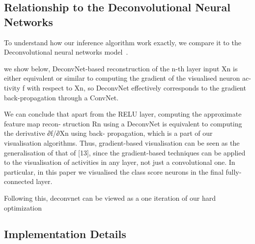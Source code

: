 \subsection{Relationship to the Deconvolutional Neural Networks}


To understand how our inference algorithm work exactly, we compare it to the Deconvolutional neural networks model~\cite{}.

we show below, DeconvNet-based reconstruction of the n-th layer input Xn is either equivalent or similar to computing the gradient of the visualised neuron ac-tivity f with respect to Xn, so DeconvNet effectively corresponds to the gradient back-propagation through a ConvNet.

We can conclude that apart from the RELU layer, computing the approximate feature map recon- struction Rn using a DeconvNet is equivalent to computing the derivative ∂f/∂Xn using back- propagation, which is a part of our visualisation algorithms. Thus, gradient-based visualisation can be seen as the generalisation of that of [13], since the gradient-based techniques can be applied to the visualisation of activities in any layer, not just a convolutional one. In particular, in this paper we visualised the class score neurons in the final fully-connected layer.

Following this, deconvnet can be viewed as a one iteration of our hard optimization

\subsection{Implementation Details}


